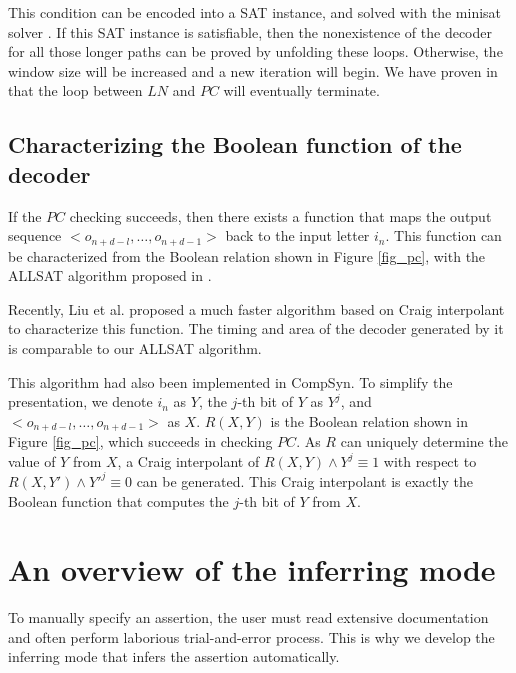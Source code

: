 \documentclass[runningheads,a4paper]{llncs}
\begin{document}
This condition can be encoded into a SAT instance,
and solved with the minisat solver \cite{EXTSAT}.
If this SAT instance is satisfiable,
then the nonexistence of the decoder for all those longer paths can be proved by unfolding these loops.
Otherwise,
the window size will be increased and a new iteration will begin.
We have proven in \cite{ShengYuShen:tcad11} that the loop between $LN$ and $PC$ will eventually terminate.



\subsection{Characterizing the Boolean function of the decoder}

If the $PC$ checking succeeds,
then there exists a function that maps the output sequence $<o_{n+d-l},\dots,o_{n+d-1}>$ back to the input letter $i_n$.
This function can be characterized from the Boolean relation shown in Figure \ref{fig_pc},
with the ALLSAT algorithm proposed in \cite{ShengYuShen:tcad}.

Recently,
Liu et al. \cite{Roland:iccad11} proposed a much faster algorithm based on Craig interpolant \cite{Craig} to characterize this function.
The timing and area of the decoder generated by it is comparable to our ALLSAT algorithm.

This algorithm had also been implemented in CompSyn.
To simplify the presentation,
we denote $i_n$ as $Y$,
the $j$-th bit of $Y$ as $Y^{j}$,
and $<o_{n+d-l},\dots,o_{n+d-1}>$ as $X$.
$R(X,Y)$ is the Boolean relation shown in Figure \ref{fig_pc},
which succeeds in checking $PC$.
As $R$ can uniquely determine the value of $Y$ from $X$,
a Craig interpolant of $R(X,Y)\wedge Y^{j}\equiv 1$ with respect to $R(X,Y')\wedge Y'^{j} \equiv 0$ can be generated.
This Craig interpolant is exactly the Boolean function that computes the $j$-th bit of $Y$ from $X$.



\section{An overview of the inferring mode}\label{sec_infer}
To manually specify an assertion,
the user must read extensive documentation
and often perform laborious trial-and-error process.
This is why we develop the inferring mode that infers the assertion automatically.
\end{document}

